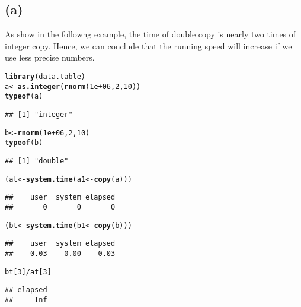 \documentclass{article}\usepackage[]{graphicx}\usepackage[]{color}
\makeatletter
\newcommand{\hlnum}[1]{\textcolor[rgb]{0.686,0.059,0.569}{#1}}%
\newcommand{\hlopt}[1]{\textcolor[rgb]{0,0,0}{#1}}%
\newcommand{\hlstd}[1]{\textcolor[rgb]{0.345,0.345,0.345}{#1}}%
\newcommand{\hlkwb}[1]{\textcolor[rgb]{0.69,0.353,0.396}{#1}}%
\newcommand{\hlkwd}[1]{\textcolor[rgb]{0.737,0.353,0.396}{\textbf{#1}}}%
\newenvironment{kframe}{%
 \def\at@end@of@kframe{}%
 \ifinner\ifhmode%
  \def\at@end@of@kframe{\end{minipage}}%
  \begin{minipage}{\columnwidth}%
 \fi\fi%
 \def\FrameCommand##1{\hskip\@totalleftmargin \hskip-\fboxsep
 \colorbox{shadecolor}{##1}\hskip-\fboxsep
     \hskip-\linewidth \hskip-\@totalleftmargin \hskip\columnwidth}%
 \MakeFramed {\advance\hsize-\width
   \@totalleftmargin\z@ \linewidth\hsize
   \@setminipage}}%
 {\par\unskip\endMakeFramed%
 \at@end@of@kframe}
\newenvironment{knitrout}{}{} %
\makeatother
\begin{document}
\subsection{(a)}
As show in the followng example, the time of double copy is nearly two times of integer copy. Hence, we can conclude that the running speed will increase if we use less precise numbers.\\
\begin{knitrout}
\color{fgcolor}\begin{kframe}
\begin{alltt}
\hlkwd{library}\hlstd{(data.table)}
\hlstd{a} \hlkwb{<-} \hlkwd{as.integer}\hlstd{(}\hlkwd{rnorm}\hlstd{(}\hlnum{1e+06}\hlstd{,} \hlnum{2}\hlstd{,} \hlnum{10}\hlstd{))}
\hlkwd{typeof}\hlstd{(a)}
\end{alltt}
\begin{verbatim}
## [1] "integer"
\end{verbatim}
\begin{alltt}
\hlstd{b} \hlkwb{<-} \hlkwd{rnorm}\hlstd{(}\hlnum{1e+06}\hlstd{,} \hlnum{2}\hlstd{,} \hlnum{10}\hlstd{)}
\hlkwd{typeof}\hlstd{(b)}
\end{alltt}
\begin{verbatim}
## [1] "double"
\end{verbatim}
\begin{alltt}
\hlstd{(at} \hlkwb{<-} \hlkwd{system.time}\hlstd{(a1} \hlkwb{<-} \hlkwd{copy}\hlstd{(a)))}
\end{alltt}
\begin{verbatim}
##    user  system elapsed 
##       0       0       0
\end{verbatim}
\begin{alltt}
\hlstd{(bt} \hlkwb{<-} \hlkwd{system.time}\hlstd{(b1} \hlkwb{<-} \hlkwd{copy}\hlstd{(b)))}
\end{alltt}
\begin{verbatim}
##    user  system elapsed 
##    0.03    0.00    0.03
\end{verbatim}
\begin{alltt}
\hlstd{bt[}\hlnum{3}\hlstd{]}\hlopt{/}\hlstd{at[}\hlnum{3}\hlstd{]}
\end{alltt}
\begin{verbatim}
## elapsed 
##     Inf
\end{verbatim}
\end{kframe}
\end{knitrout}
\end{document}
